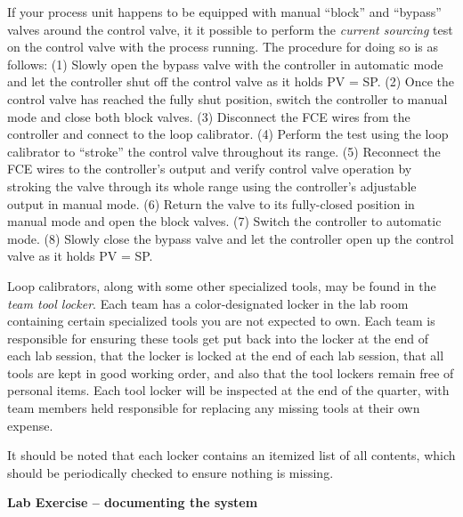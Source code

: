 If your process unit happens to be equipped with manual ``block'' and ``bypass'' valves around the control valve, it it possible to perform the {\it current sourcing} test on the control valve with the process running.  The procedure for doing so is as follows: (1) Slowly open the bypass valve with the controller in automatic mode and let the controller shut off the control valve as it holds PV = SP.  (2) Once the control valve has reached the fully shut position, switch the controller to manual mode and close both block valves.  (3) Disconnect the FCE wires from the controller and connect to the loop calibrator.  (4) Perform the test using the loop calibrator to ``stroke'' the control valve throughout its range.  (5) Reconnect the FCE wires to the controller's output and verify control valve operation by stroking the valve through its whole range using the controller's adjustable output in manual mode.  (6) Return the valve to its fully-closed position in manual mode and open the block valves.  (7) Switch the controller to automatic mode.  (8) Slowly close the bypass valve and let the controller open up the control valve as it holds PV = SP.

\vskip 10pt

Loop calibrators, along with some other specialized tools, may be found in the {\it team tool locker}.  Each team has a color-designated locker in the lab room containing certain specialized tools you are not expected to own.  Each team is responsible for ensuring these tools get put back into the locker at the end of each lab session, that the locker is locked at the end of each lab session, that all tools are kept in good working order, and also that the tool lockers remain free of personal items.  Each tool locker will be inspected at the end of the quarter, with team members held responsible for replacing any missing tools at their own expense.

It should be noted that each locker contains an itemized list of all contents, which should be periodically checked to ensure nothing is missing.









\vfil \eject

\noindent
{\bf Lab Exercise -- documenting the system}

\vskip 5pt

